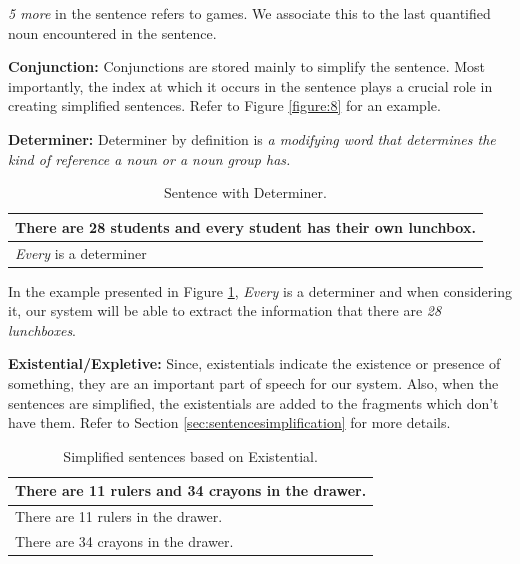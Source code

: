 \documentclass[11pt]{article}
\begin{document}
\textit{5 more} in the sentence refers to games. We associate this to the last quantified noun encountered in the sentence.
\vspace{4mm}

\newpage

\textbf{Conjunction:} Conjunctions are stored mainly to simplify the sentence. Most importantly, the index at which it occurs in the sentence plays a crucial role in creating simplified sentences. Refer to Figure \ref{figure:8} for an example.
\vspace{4mm}

\textbf{Determiner:} Determiner by definition is \textit{a modifying word that determines the kind of reference a noun or a noun group has.} 

\begin{table}[h!]
\centering
\begin{tabular}{ | m{25em} | }
\hline
\textbf{There are 28 students and every student has their own lunchbox.}\\
\hline
\textit{Every} is a determiner\\
\hline
\end{tabular}
\caption{Sentence with Determiner.}
\label{figure:4}
\end{table}

In the example presented in Figure \ref{figure:4}, \textit{Every} is a determiner and when considering it, our system will be able to extract the information that there are \textit{28 lunchboxes}.
\vspace{4mm}

\textbf{Existential/Expletive:} Since, existentials indicate the existence or presence of something, they are an important part of speech for our system. Also, when the sentences are simplified, the existentials are added to the fragments which don't have them. Refer to Section \ref{sec:sentencesimplification} for more details.

\begin{table}[h!]
\centering
\begin{tabular}{ | m{25em} | }
\hline
\textbf{There are 11 rulers and 34 crayons in the drawer.}\\
\hline
There are 11 rulers in the drawer.\\
\hline
There are 34 crayons in the drawer.\\
\hline
\end{tabular}
\caption{Simplified sentences based on Existential.}
\label{figure:5}
\end{table}
\end{document}
